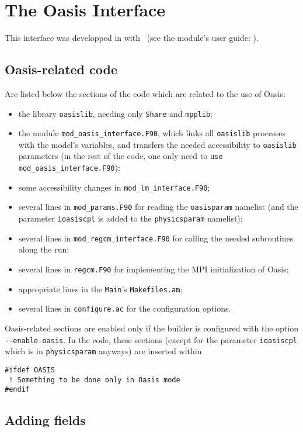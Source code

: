 \chapter{The Oasis Interface}

This interface was developped in \PR with \OA\ (see the module's user guide:
\cite{valcke_oasis}).

\section{Oasis-related code}

Are listed below the sections of the code which are related to the use of Oasis:
\begin{itemize}
	\item 	the library \verb=oasislib=, needing only \verb=Share= and \verb=mpplib=;
	\item 	the module \verb=mod_oasis_interface.F90=, which links all \verb=oasislib=
		processes with the model's variables, and transfers the needed
		accessibility to \verb=oasislib= parameters (in the rest of the code,
		one only need to \verb=use mod_oasis_interface.F90=);
	\item	some accessibility changes in \verb=mod_lm_interface.F90=;
	\item	several lines in \verb=mod_params.F90= for reading the \verb=oasisparam=
		namelist (and the parameter \verb=ioasiscpl= is added to the
		\verb=physicsparam= namelist);
	\item	several lines in \verb=mod_regcm_interface.F90= for calling the needed
		subroutines along the run;
	\item	several lines in \verb=regcm.F90= for implementing the MPI initialization
		of Oasis;
	\item	appropriate lines in the \verb=Main='s \verb=Makefiles.am=;
	\item	several lines in \verb=configure.ac= for the configuration options.
\end{itemize}

Oasis-related sections are enabled only if the builder is configured with
the option \verb=--enable-oasis=. In the code, these sections (except for the parameter
\verb=ioasiscpl= which is in \verb=physicsparam= anyways) are inserted within
\begin{verbatim}
#ifdef OASIS
 ! Something to be done only in Oasis mode
#endif
\end{verbatim}

\section{Adding fields}


